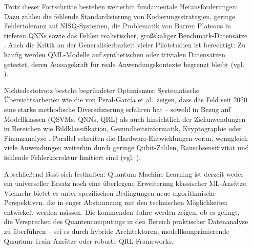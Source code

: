 Trotz dieser Fortschritte bestehen weiterhin fundamentale Herausforderungen: Dazu zählen die fehlende Standardisierung von Kodierungsstrategien, geringe Fehlertoleranz auf NISQ-Systemen, die Problematik von Barren Plateaus in tieferen QNNs sowie das Fehlen realistischer, großskaliger Benchmark-Datensätze . Auch die Kritik an der Generalisierbarkeit vieler Pilotstudien ist berechtigt: Zu häufig werden QML-Modelle auf synthetischen oder trivialen Datensätzen getestet, deren Aussagekraft für reale Anwendungskontexte begrenzt bleibt (vgl. \cite{bowlesBetterClassicalSubtle2024, peral-garciaSystematicLiteratureReview2024}).

Nichtsdestotrotz besteht begründeter Optimismus: Systematische Übersichtsarbeiten wie die von Peral-García et al.\ zeigen, dass das Feld seit 2020 eine starke methodische Diversifizierung erfahren hat – sowohl in Bezug auf Modellklassen (QSVMs, QNNs, QRL) als auch hinsichtlich der Zielanwendungen in Bereichen wie Bildklassifikation, Gesundheitsinformatik, Kryptographie oder Finanzanalyse . Parallel schreiten die Hardware-Entwicklungen voran, wenngleich viele Anwendungen weiterhin durch geringe Qubit-Zahlen, Rauschsensitivität und fehlende Fehlerkorrektur limitiert sind (vgl. \cite{peral-garciaSystematicLiteratureReview2024}).

Abschließend lässt sich festhalten: Quantum Machine Learning ist derzeit weder ein universeller Ersatz noch eine überlegene Erweiterung klassischer ML-Ansätze. Vielmehr bietet es unter spezifischen Bedingungen neue algorithmische Perspektiven, die in enger Abstimmung mit den technischen Möglichkeiten entwickelt werden müssen. Die kommenden Jahre werden zeigen, ob es gelingt, die Versprechen des Quantencomputings in den Bereich praktischer Datenanalyse zu überführen – sei es durch hybride Architekturen, modellkomprimierende Quantum-Train-Ansätze oder robuste QRL-Frameworks.

\printbibliography
